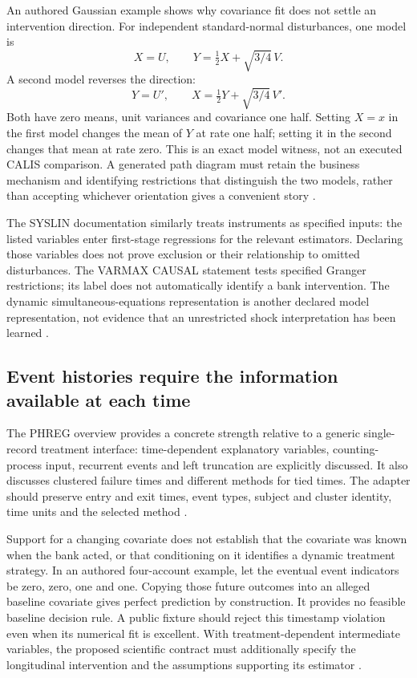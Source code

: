 An authored Gaussian example shows why covariance fit does not settle an
intervention direction. For independent standard-normal disturbances, one
model is
\[
 X=U,\qquad Y=\tfrac12X+\sqrt{3/4}\,V.
\]
A second model reverses the direction:
\[
 Y=U',\qquad X=\tfrac12Y+\sqrt{3/4}\,V'.
\]
Both have zero means, unit variances and covariance one half. Setting $X=x$
in the first model changes the mean of $Y$ at rate one half; setting it in
the second changes that mean at rate zero. This is an exact model witness,
not an executed CALIS comparison. A generated path diagram must retain the
business mechanism and identifying restrictions that distinguish the two
models, rather than accepting whichever orientation gives a convenient
story \cite{exec24_sas_choice}.

The SYSLIN documentation similarly treats instruments as specified inputs:
the listed variables enter first-stage regressions for the relevant
estimators. Declaring those variables does not prove exclusion or their
relationship to omitted disturbances. The VARMAX CAUSAL statement tests
specified Granger restrictions; its label does not automatically identify
a bank intervention. The dynamic simultaneous-equations representation is
another declared model representation, not evidence that an unrestricted
shock interpretation has been learned
\cite{exec13_ivrd_sas,exec13_ct_sas_causal,exec13_ct_sas_structural}.

\subsection{Event histories require the information available at each time}
The PHREG overview provides a concrete strength relative to a generic
single-record treatment interface: time-dependent explanatory variables,
counting-process input, recurrent events and left truncation are explicitly
discussed. It also discusses clustered failure times and different methods
for tied times. The adapter should preserve entry and exit times, event
types, subject and cluster identity, time units and the selected method
\cite{exec14_survival_sas}.

Support for a changing covariate does not establish that the covariate was
known when the bank acted, or that conditioning on it identifies a dynamic
treatment strategy. In an authored four-account example, let the eventual
event indicators be zero, zero, one and one. Copying those future outcomes
into an alleged baseline covariate gives perfect prediction by construction.
It provides no feasible baseline decision rule. A public fixture should
reject this timestamp violation even when its numerical fit is excellent.
With treatment-dependent intermediate variables, the proposed scientific
contract must additionally specify the longitudinal intervention and the
assumptions supporting its estimator
\cite{exec24_sas_choice}.

